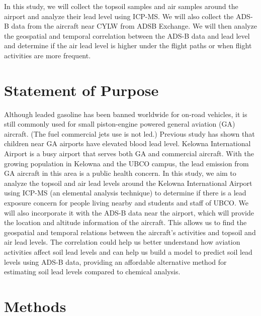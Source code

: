 \documentclass[12pt]{article}
\begin{document}
In this study, we will collect the topsoil samples and air samples around the airport and analyze their lead level using ICP-MS. We will also collect the ADS-B data from the aircraft near CYLW from ADSB Exchange\cite{adsbexchange}. We will then analyze the geospatial and temporal correlation between the ADS-B data and lead level and determine if the air lead level is higher under the flight paths or when flight activities are more frequent. 
\section{Statement of Purpose}

Although leaded gasoline has been banned worldwide for on-road vehicles, it is still commonly used for small piston-engine powered general aviation (GA) aircraft. (The fuel commercial jets use is not led.) Previous study has shown that children near GA airports have elevated blood lead level.\cite{miranda_geospatial_2011} \cite{zahran_leaded_2023} \cite{mills_lead_2022} \cite{zahran_effect_2017} Kelowna International Airport is a busy airport that serves both GA and commercial aircraft. With the growing population in Kelowna and the UBCO campus, the lead emission from GA aircraft in this area is a public health concern. In this study, we aim to analyze the topsoil and air lead levels around the Kelowna International Airport using ICP-MS (an elemental analysis technique) to determine if there is a lead exposure concern for people living nearby and students and staff of UBCO. We will also incorporate it with the ADS-B data near the airport, which will provide the location and altitude information of the aircraft. This allows us to find the geospatial and temporal relations between the aircraft's activities and topsoil and air lead levels. The correlation could help us better understand how aviation activities affect soil lead levels and can help us build a model to predict soil lead levels using ADS-B data, providing an affordable alternative method for estimating soil lead levels compared to chemical analysis.
\section{Methods}
\end{document}
